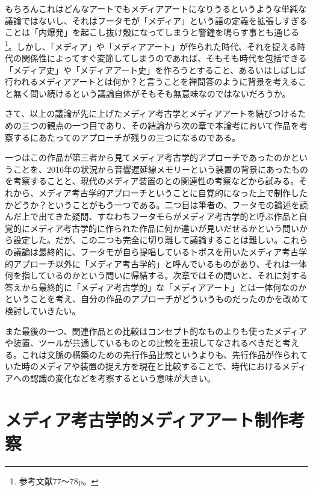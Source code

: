 \documentclass[a4paper,report]{jsbook}
\begin{document}
もちろんこれはどんなアートでもメディアアートになりうるというような単純な議論ではないし、それはフータモが「メディア」という語の定義を拡張しすぎることは「内爆発」を起こし抜け殻になってしまうと警鐘を鳴らす事とも通じる\footnote{参考文献\autocite{huhtamo:mediaarcheology}77〜78p。}。しかし、「メディア」や「メディアアート」が作られた時代、それを捉える時代の関係性によってすぐ変節してしまうのであれば、そもそも時代を包括できる「メディア史」や「メディアアート史」を作ろうとすること、あるいはしばしば行われるメディアアートとは何か？と言うことを禅問答のように背景を考えること無く問い続けるという議論自体がそもそも無意味なのではないだろうか。

さて、以上の議論が先に上げたメディア考古学とメディアアートを結びつけるための三つの観点の一つ目であり、その結論から次の章で本論考において作品を考察するにあたってのアプローチが残りの三つになるのである。

一つはこの作品が第三者から見てメディア考古学的アプローチであったのかということを、2016年の状況から音響遅延線メモリーという装置の背景にあったものを考察することと、現代のメディア装置のとの関連性の考察などから試みる。それから、メディア考古学的アプローチということに自覚的になった上で制作したかどうか？ということがもう一つである。二つ目は筆者の、フータモの論述を読んだ上で出てきた疑問、すなわちフータモらがメディア考古学的と呼ぶ作品と自覚的にメディア考古学的に作られた作品に何か違いが見いだせるかという問いから設定した。だが、この二つも完全に切り離して議論することは難しい。これらの議論は最終的に、フータモが自ら提唱しているトポスを用いたメディア考古学的アプローチ以外に「メディア考古学的」と呼んでいるものがあり、それは一体何を指しているのかという問いに帰結する。次章ではその問いと、それに対する答えから最終的に「メディア考古学的」な「メディアアート」とは一体何なのかということを考え、自分の作品のアプローチがどういうものだったのかを改めて検討していきたい。

また最後の一つ、関連作品との比較はコンセプト的なものよりも使ったメディアや装置、ツールが共通しているものとの比較を重視してなされるべきだと考える。これは文脈の構築のための先行作品比較というよりも、先行作品が作られていた時のメディアや装置の捉え方を現在と比較することで、時代におけるメディアへの認識の変化などを考察するという意味が大きい。

\chapter{メディア考古学的メディアアート制作考察}\label{ux30e1ux30c7ux30a3ux30a2ux8003ux53e4ux5b66ux7684ux30e1ux30c7ux30a3ux30a2ux30a2ux30fcux30c8ux5236ux4f5cux8003ux5bdf}
\end{document}
